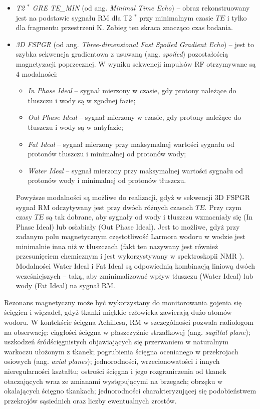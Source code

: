 \begin{itemize}
	\item \textit{T2 $^\ast$ GRE TE\_MIN} (od ang. \textit{Minimal Time Echo}) -- obraz rekonstruowany jest na podstawie sygnału RM dla T2 $^\ast$  przy minimalnym czasie $TE$ i tylko dla fragmentu przestrzeni K. Zabieg ten skraca znacząco czas badania.
	\item \textit{3D FSPGR} (od ang. \textit{Three-dimensional Fast Spoiled Gradient Echo}) -- jest to szybka sekwencja gradientowa z usuwaną (ang. \textit{spoiled}) pozostałością magnetyzacji poprzecznej. W wyniku sekwencji impulsów RF otrzymywane są 4 modalności: 
	\begin{itemize}
		\item \textit{In Phase Ideal} -- sygnał mierzony w czasie, gdy protony należące do tłuszczu i wody są w zgodnej fazie;
		\item \textit{Out Phase Ideal} -- sygnał mierzony w czasie, gdy protony należące do tłuszczu i wody są w antyfazie;
		\item \textit{Fat Ideal} -- sygnał mierzony przy maksymalnej wartości sygnału od protonów tłuszczu i minimalnej od protonów wody;
		\item \textit{Water Ideal} -- sygnał mierzony przy maksymalnej wartości sygnału od protonów wody i minimalnej od protonów tłuszczu.
	\end{itemize}
	Powyższe modalności są możliwe do realizacji, gdyż w sekwencji 3D FSPGR sygnał RM odczytywany jest przy dwóch różnych czasach $TE$. Przy czym czasy $TE$ są tak dobrane, aby sygnały od wody i tłuszczu wzmacniały się (In Phase Ideal) lub osłabiały (Out Phase Ideal). Jest to możliwe, gdyż przy zadanym polu magnetycznym częstotliwość Larmora wodoru w wodzie jest minimalnie inna niż w tłuszczach (fakt ten nazywany jest również przesunięciem chemicznym i jest wykorzystywany w spektroskopii NMR \cite{lide2006crc}). Modalności Water Ideal i Fat Ideal są odpowiednią kombinacją liniową dwóch wcześniejszych -- taką, aby zminimalizować wpływ tłuszczu (Water Ideal) lub wody (Fat Ideal) na sygnał RM.
\end{itemize}

Rezonans magnetyczny może być wykorzystany do monitorowania gojenia się ścięgien i więzadeł, gdyż tkanki miękkie człowieka zawierają dużo atomów wodoru. W kontekście ścięgna Achillesa, RM w szczególności pozwala radiologom na obserwację: ciągłości ścięgna w płaszczyźnie strzałkowej (ang. \textit{sagittal plane}); uszkodzeń śródścięgnistych objawiających się przerwaniem w naturalnym warkoczu ułożonym z tkanek; pogrubienia ścięgna ocenianego w przekrojach osiowych (ang. \textit{axial planes}); jednorodności, wrzecionowatości i innych nieregularności kształtu; ostrości ścięgna i jego rozgraniczenia od tkanek otaczających wraz ze zmianami występującymi na brzegach; obrzęku w okalających ścięgno tkankach; jednorodności charakteryzującej się podobieństwem przekrojów sąsiednich oraz liczby ewentualnych zrostów.

